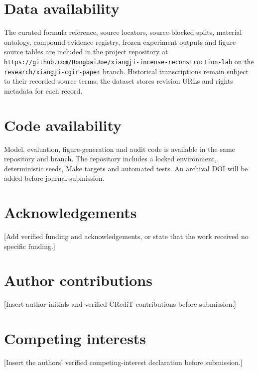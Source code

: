\documentclass[11pt]{article}
\begin{document}
\section*{Data availability}

The curated formula reference, source locators, source-blocked splits, material ontology, compound-evidence registry, frozen experiment outputs and figure source tables are included in the project repository at \nolinkurl{https://github.com/HongbaiJoe/xiangji-incense-reconstruction-lab} on the \texttt{research/xiangji-cgir-paper} branch. Historical transcriptions remain subject to their recorded source terms; the dataset stores revision URLs and rights metadata for each record.

\section*{Code availability}

Model, evaluation, figure-generation and audit code is available in the same repository and branch. The repository includes a locked environment, deterministic seeds, Make targets and automated tests. An archival DOI will be added before journal submission.

\section*{Acknowledgements}

[Add verified funding and acknowledgements, or state that the work received no specific funding.]

\section*{Author contributions}

[Insert author initials and verified CRediT contributions before submission.]

\section*{Competing interests}

[Insert the authors' verified competing-interest declaration before submission.]
\end{document}
